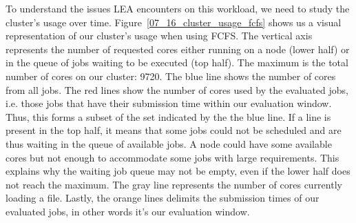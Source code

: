 \documentclass[conference,10pt]{IEEEtran}
\begin{document}
To understand the issues LEA encounters on this workload, we need to study the cluster's usage over time.
Figure~\ref{07_16_cluster_usage_fcfs} shows us a visual representation of 
our cluster's usage when using FCFS.
The vertical axis represents the number of requested cores either running on a
node (lower half) or in the queue of jobs waiting to be executed (top
half). The maximum is the total number of cores on our cluster: 9720.
The blue line shows the number of cores from all jobs.
The red lines show the number of cores used by the evaluated jobs, i.e.
those jobs that have their submission time within our evaluation window. Thus, this forms a subset
of the set indicated by the the blue line.
If a line is present in the top half, it means that some jobs could not be scheduled
and are thus waiting in the queue of available jobs. 
A node could have some available cores but not enough to accommodate some jobs with large requirements.
This explains why the waiting job queue may not be empty, even if the lower half does not reach the maximum.
The gray line represents the number of cores currently loading a file.
Lastly, the orange lines delimits the submission times of our 
evaluated jobs, in other words it's our evaluation window.
\end{document}
